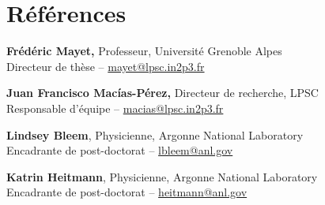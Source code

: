 \section{Références}\label{references}

\textbf{Fr\'ed\'eric Mayet,}
    Professeur, Universit\'e Grenoble Alpes \\
    Directeur de thèse -- \url{mayet@lpsc.in2p3.fr}

\textbf{Juan Francisco Mac\'ias-P\'erez,}
    Directeur de recherche, LPSC \\
    Responsable d'équipe -- \url{macias@lpsc.in2p3.fr}

\textbf{Lindsey Bleem},
    Physicienne, Argonne National Laboratory \\
    Encadrante de post-doctorat -- \url{lbleem@anl.gov}

\textbf{Katrin Heitmann},
    Physicienne, Argonne National Laboratory \\
    Encadrante de post-doctorat -- \url{heitmann@anl.gov}

